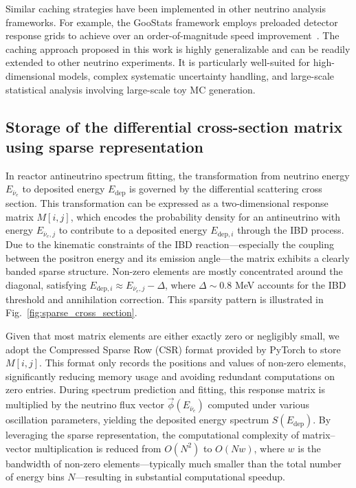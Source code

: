 \documentclass[xetex,twocolumn,epjc3]{svjour3}
\begin{document}
Similar caching strategies have been implemented in other neutrino analysis frameworks. For example, the GooStats framework employs preloaded detector response grids to achieve over an order-of-magnitude speed improvement~\cite{Ding_2018}. The caching approach proposed in this work is highly generalizable and can be readily extended to other neutrino experiments. It is particularly well-suited for high-dimensional models, complex systematic uncertainty handling, and large-scale statistical analysis involving large-scale toy MC generation.

\subsection{Storage of the differential cross-section matrix using sparse representation}
In reactor antineutrino spectrum fitting, the transformation from neutrino energy $E_{\overline{\nu}_e}$ to deposited energy $E_{\text{dep}}$ is governed by the differential scattering cross section. This transformation can be expressed as a two-dimensional response matrix $M[i,j]$, which encodes the probability density for an antineutrino with energy $E_{{\overline{\nu}_e},j}$ to contribute to a deposited energy $E_{\text{dep},i}$ through the IBD process. Due to the kinematic constraints of the IBD reaction—especially the coupling between the positron energy and its emission angle—the matrix exhibits a clearly banded sparse structure. Non-zero elements are mostly concentrated around the diagonal, satisfying $E_{\text{dep},i} \approx E_{\overline{\nu}_e,j} - \Delta$, where $\Delta \sim 0.8$ MeV accounts for the IBD threshold and annihilation correction. This sparsity pattern is illustrated in Fig.~\ref{fig:sparse_cross_section}.

Given that most matrix elements are either exactly zero or negligibly small, we adopt the Compressed Sparse Row (CSR) format provided by PyTorch to store $M[i,j]$. This format only records the positions and values of non-zero elements, significantly reducing memory usage and avoiding redundant computations on zero entries. During spectrum prediction and fitting, this response matrix is multiplied by the neutrino flux vector $\vec{\phi}(E_{\overline{\nu}_e})$ computed under various oscillation parameters, yielding the deposited energy spectrum $S(E_{\text{dep}})$. By leveraging the sparse representation, the computational complexity of matrix–vector multiplication is reduced from $O(N^2)$ to $O(Nw)$, where $w$ is the bandwidth of non-zero elements—typically much smaller than the total number of energy bins $N$—resulting in substantial computational speedup.
\end{document}

